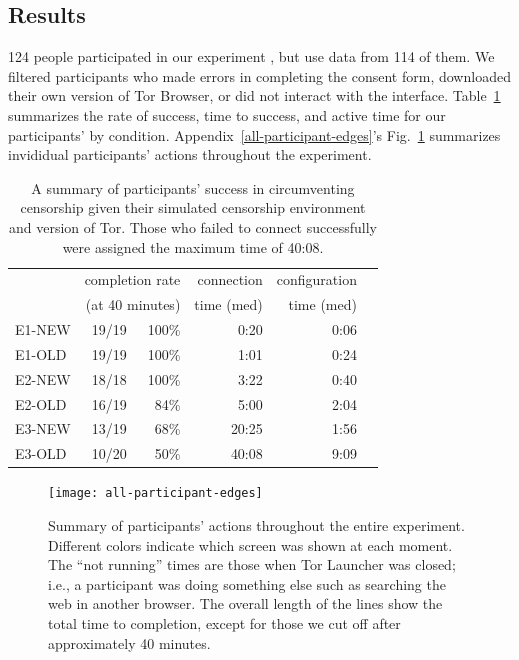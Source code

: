 \documentclass[USenglish,oneside,twocolumn]{article}
\begin{document}
\subsection{Results} 
{\color {blue} 
124 people participated in our experiment , but use data from 114 of them. We filtered participants who made errors in completing the consent form, downloaded their own version of Tor Browser, or did not interact with the interface. Table~\ref{table:participant-summary} summarizes the rate of success, time to success, and active time for our participants' by condition. Appendix~\ref{all-participant-edges}'s Fig.~\ref{fig:all-participant-edges} summarizes invididual participants' actions throughout the experiment.
}

\begin{table}
\centering
\begin{tabular}{l r r r r r}
& \multicolumn{2}{r}{completion rate} & \multicolumn{1}{r}{connection} & \multicolumn{1}{r}{configuration} \\
& \multicolumn{2}{r}{(at 40 minutes)} & \multicolumn{1}{r}{time (med)} & \multicolumn{1}{r}{time (med)} \\
\noalign{\hrule}
E1-NEW & 19/19 & 100\% & 0:20 & 0:06 \\
E1-OLD & 19/19 & 100\% & 1:01 & 0:24 \\
E2-NEW & 18/18 & 100\% & 3:22 & 0:40 \\
E2-OLD & 16/19 & 84\% & 5:00 & 2:04 \\
E3-NEW & 13/19 & 68\% & 20:25 & 1:56 \\
E3-OLD & 10/20 & 50\% & 40:08 & 9:09 \\
\end{tabular}
\caption{
A summary of participants' success in circumventing censorship
given their simulated censorship environment and version of Tor. Those who
failed to connect successfully were assigned the maximum time of 40:08.
}
\label{table:participant-summary}
\end{table}

\label{all-participant-edges} 
\begin{figure}
\centering
\texttt{[image: all-participant-edges]}
\caption{
Summary of participants' actions throughout the entire experiment.
Different colors indicate which screen was shown at each moment.
The ``not running'' times are those when Tor Launcher was closed;
i.e., a participant was doing something else
such as searching the web in another browser.
The overall length of the lines show the total time to completion,
except for those we cut off after approximately 40 minutes.
}
\label{fig:all-participant-edges}
\end{figure}
\end{document}
